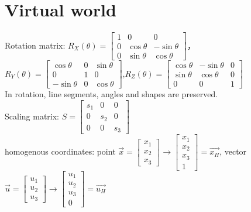 \documentclass[12pt]{article}
\begin{document}
\section{Virtual world}\noindent
Rotation matrix: $R_X(\theta)=\begin{bmatrix}
    1 & 0 & 0\\
    0 & \cos\theta & -\sin\theta\\
    0 & \sin\theta & \cos\theta
\end{bmatrix}$，$R_Y(\theta)=\begin{bmatrix}
    \cos\theta & 0 & \sin\theta\\
    0 & 1 & 0\\
    -\sin\theta & 0 & \cos\theta
\end{bmatrix}$,$R_Z(\theta)=\begin{bmatrix}
    \cos\theta & -\sin\theta & 0\\
    \sin\theta & \cos\theta & 0\\
    0 & 0 & 1
\end{bmatrix}$\\
In rotation, line segments, angles and shapes are preserved.\\
Scaling matrix: $S=\begin{bmatrix}
    s_1 & 0 & 0\\
    0 & s_2 & 0\\
    0 & 0 & s_3
\end{bmatrix}$\\
homogenous coordinates: point $\vec{x}=\begin{bmatrix}
    x_1\\ x_2\\ x_3
\end{bmatrix}\rightarrow\begin{bmatrix}
    x_1\\ x_2\\ x_3\\ 1
\end{bmatrix}=\vec{x_H}$, vector $\vec{u}=\begin{bmatrix}
    u_1\\ u_2\\ u_3
\end{bmatrix}\rightarrow\begin{bmatrix}
    u_1\\ u_2\\ u_3\\ 0
\end{bmatrix}=\vec{u_H}$\\
\end{document}
